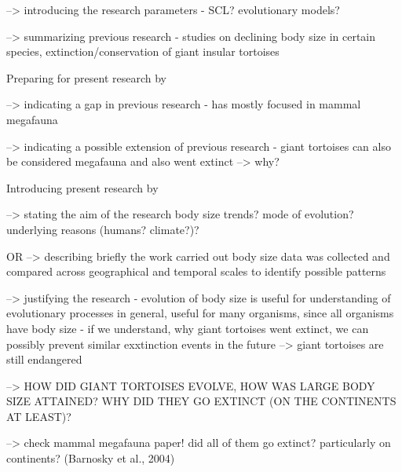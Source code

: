 --> introducing the research parameters
- SCL? evolutionary models?

--> summarizing previous research
- studies on declining body size in certain species, extinction/conservation of giant insular tortoises

Preparing for present research by

--> indicating a gap in previous research
- has mostly focused in mammal megafauna

--> indicating a possible extension of previous research
- giant tortoises can also be considered megafauna and also went extinct --> why?

Introducing present research by

--> stating the aim of the research
body size trends? mode of evolution? underlying reasons (humans? climate?)?

OR 
--> describing briefly the work carried out
body size data was collected and compared across geographical and temporal scales to identify possible patterns

--> justifying the research
- evolution of body size is useful for understanding of evolutionary processes in general, useful for many organisms, since all organisms have body size
- if we understand, why giant tortoises went extinct, we can possibly prevent similar exxtinction events in the future --> giant tortoises are still endangered


--> HOW DID GIANT TORTOISES EVOLVE, HOW WAS LARGE BODY SIZE ATTAINED? WHY DID THEY GO EXTINCT (ON THE CONTINENTS AT LEAST)?


--> check mammal megafauna paper! did all of them go extinct? particularly on continents? (Barnosky et al., 2004)
